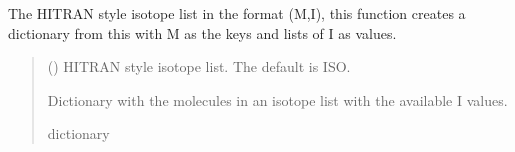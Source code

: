 \documentclass[letterpaper,10pt,english]{sphinxmanual}
\begin{document}
\begin{fulllineitems}
\pysigstopsignatures
\sphinxAtStartPar
The HITRAN style isotope list in the format (M,I), this function creates a dictionary from this with M as the keys and lists of I as values.
\begin{quote}\begin{description}
\sphinxAtStartPar
{} (\sphinxstyleliteralemphasis{\sphinxupquote{, }}) \textendash{} HITRAN style isotope list. The default is ISO.

\sphinxAtStartPar
{} \textendash{} Dictionary with the molecules in an isotope list with the available I values.

\sphinxAtStartPar
dictionary

\end{description}\end{quote}

\end{fulllineitems}


\begin{fulllineitems}
\label{\detokenize{MATS:MATS.utilities.max_iter}}
\pysigstartsignatures
{}
\pysigstopsignatures
\end{fulllineitems}

\end{document}
